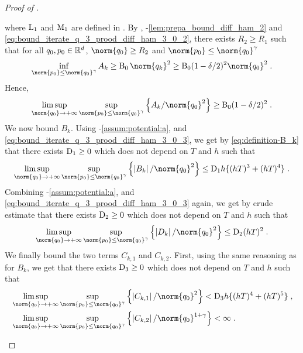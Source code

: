 \begin{proof}[Proof of ]
\begin{enumerate}[label=(\alph*),leftmargin=0cm,itemindent=0.5cm,labelwidth=1.2\itemindent,labelsep=0cm,align=left]
where $\mathrm{L}_1$ and $\mathrm{M}_1$ are defined in . By  , -\ref{lem:prepa_bound_diff_ham_2} and \eqref{eq:bound_iterate_q_3_prood_diff_ham_3_0_2}, there exists $R_2 \geq R_1$ such that for all $q_0,p_0 \in \mathbb{R}^d$, $\norm{\q_0} \geq R_2$ and $\norm{\p_0} \leq \norm{\q_0}^{\gamma}$
\begin{equation}
\label{eq:bound_A_k_2}
  \inf_{\norm{p_0} \leq \norm{q_0}^{\gamma}} A_k \geq \BB_0 \norm{q_k}^{2} \geq
  \BB_0 (1-\delta/2)^{2} \norm{q_0}^{2} \eqsp.
\end{equation}
Hence,
\begin{equation}
\label{eq:bound_A_k_2_2}
\limsup_{\norm{q_0} \to \plusinfty} \sup_{\norm{p_0} \leq \norm{q_0}^{\gamma}}\defEns{A_k/\norm{q_0}^{2}} \geq   \BB_0 (1-\delta/2)^{2}  \eqsp.
\end{equation}
We now bound $B_k$. Using -\ref{assum:potential:a},  and \eqref{eq:bound_iterate_q_3_prood_diff_ham_3_0_3}, we get by \eqref{eq:definition-B_k} that there exists $\mathrm{D}_1 \geq 0$ which does not depend on $T$ and $h$ such that
\begin{equation}
\label{eq:bound_B_k_2}
\limsup_{\norm{q_0} \to \plusinfty} \sup_{\norm{p_0} \leq \norm{q_0}^{\gamma}}\defEns{\abs{B_k}/\norm{q_0}^{2}} \leq \rmD_1 h  \{(hT)^3 + (hT)^4\}  \eqsp.
\end{equation}
Combining -\ref{assum:potential:a},  and \eqref{eq:bound_iterate_q_3_prood_diff_ham_3_0_3} again, we get by crude estimate that there exists $\mathrm{D}_2 \geq 0$ which does not depend on $T$ and $h$ such that
\begin{equation}
  \label{eq:bound_D_k_2}
  \limsup_{\norm{q_0} \to \plusinfty} \sup_{\norm{p_0} \leq \norm{q_0}^{\gamma}} \defEns{\abs{D_k}/\norm{q_0}^{2}} \leq \rmD_2 (hT)^2 \eqsp.
\end{equation}
We finally bound the two terms $C_{k,1}$ and $C_{k,2}$. First,
using the same reasoning as for $B_k$, we get that there exists $\mathrm{D}_3 \geq 0$ which does not depend on $T$ and $h$ such that
\begin{equation}
\label{eq:bound_C_k_2}
\begin{aligned}
&\limsup_{\norm{q_0} \to \plusinfty} \sup_{\norm{p_0} \leq \norm{q_0}^{\gamma}} \defEns{\abs{C_{k,1}}/\norm{q_0}^{2}} < \rmD_3 h \{(hT)^4 + (hT)^5\} \eqsp,\\
&\limsup_{\norm{q_0} \to \plusinfty} \sup_{\norm{p_0} \leq \norm{q_0}^{\gamma}} \defEns{\abs{C_{k,2}}/\norm{q_0}^{1+\gamma}} < \infty \eqsp.

\end{aligned}
\end{equation}
\end{enumerate}
\end{proof}
